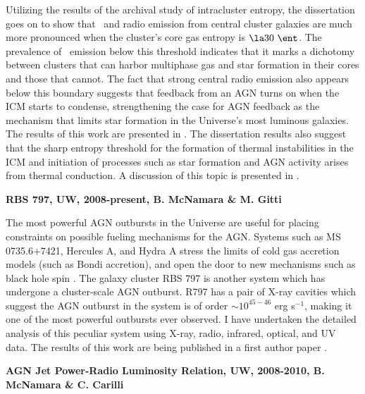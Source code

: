 \documentclass[12pt]{cv}
\begin{document}
Utilizing the results of the archival study of intracluster entropy,
the dissertation goes on to show that \halpha\ and radio emission from
central cluster galaxies are much more pronounced when the cluster's
core gas entropy is $\la 30 ~\ent$. The prevalence of \halpha\ emission
below this threshold indicates that it marks a dichotomy between
clusters that can harbor multiphase gas and star formation in their
cores and those that cannot. The fact that strong central radio
emission also appears below this boundary suggests that feedback from
an AGN turns on when the ICM starts to condense, strengthening the
case for AGN feedback as the mechanism that limits star formation in
the Universe's most luminous galaxies. The results of this work are
presented in \cite{haradent}. The dissertation results also suggest
that the sharp entropy threshold for the formation of thermal
instabilities in the ICM and initiation of processes such as star
formation and AGN activity arises from thermal conduction. A
discussion of this topic is presented in \cite{conduction}.

{\bfseries{RBS 797, UW, 2008-present, B. McNamara \& M. Gitti}}

The most powerful AGN outbursts in the Universe are useful for placing
constraints on possible fueling mechanisms for the AGN. Systems such
as MS 0735.6+7421, Hercules A, and Hydra A stress the limits of cold
gas accretion models (such as Bondi accretion), and open the door to
new mechanisms such as black hole spin \cite{bhspin}. The galaxy
cluster RBS 797 is another system which has undergone a cluster-scale
AGN outburst. R797 has a pair of X-ray cavities which suggest the AGN
outburst in the system is of order $\sim 10^{45-46}$ erg s$^{-1}$,
making it one of the most powerful outbursts ever observed. I have
undertaken the detailed analysis of this peculiar system using X-ray,
radio, infrared, optical, and UV data. The results of this work are
being published in a first author paper \cite{r797}.

{\bfseries{AGN Jet Power-Radio Luminosity Relation, UW, 2008-2010, B. McNamara \& C. Carilli}}
\end{document}
